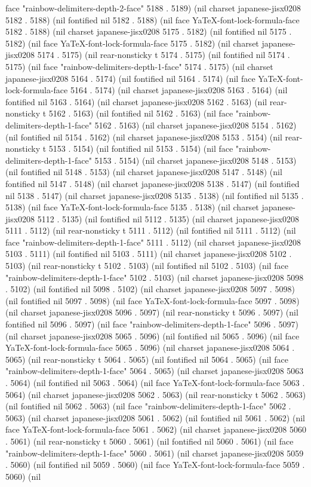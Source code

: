 face "rainbow-delimiters-depth-2-face" 5188 . 5189) (nil charset japanese-jisx0208 5182 . 5188) (nil fontified nil 5182 . 5188) (nil face YaTeX-font-lock-formula-face 5182 . 5188) (nil charset japanese-jisx0208 5175 . 5182) (nil fontified nil 5175 . 5182) (nil face YaTeX-font-lock-formula-face 5175 . 5182) (nil charset japanese-jisx0208 5174 . 5175) (nil rear-nonsticky t 5174 . 5175) (nil fontified nil 5174 . 5175) (nil face "rainbow-delimiters-depth-1-face" 5174 . 5175) (nil charset japanese-jisx0208 5164 . 5174) (nil fontified nil 5164 . 5174) (nil face YaTeX-font-lock-formula-face 5164 . 5174) (nil charset japanese-jisx0208 5163 . 5164) (nil fontified nil 5163 . 5164) (nil charset japanese-jisx0208 5162 . 5163) (nil rear-nonsticky t 5162 . 5163) (nil fontified nil 5162 . 5163) (nil face "rainbow-delimiters-depth-1-face" 5162 . 5163) (nil charset japanese-jisx0208 5154 . 5162) (nil fontified nil 5154 . 5162) (nil charset japanese-jisx0208 5153 . 5154) (nil rear-nonsticky t 5153 . 5154) (nil fontified nil 5153 . 5154) (nil face "rainbow-delimiters-depth-1-face" 5153 . 5154) (nil charset japanese-jisx0208 5148 . 5153) (nil fontified nil 5148 . 5153) (nil charset japanese-jisx0208 5147 . 5148) (nil fontified nil 5147 . 5148) (nil charset japanese-jisx0208 5138 . 5147) (nil fontified nil 5138 . 5147) (nil charset japanese-jisx0208 5135 . 5138) (nil fontified nil 5135 . 5138) (nil face YaTeX-font-lock-formula-face 5135 . 5138) (nil charset japanese-jisx0208 5112 . 5135) (nil fontified nil 5112 . 5135) (nil charset japanese-jisx0208 5111 . 5112) (nil rear-nonsticky t 5111 . 5112) (nil fontified nil 5111 . 5112) (nil face "rainbow-delimiters-depth-1-face" 5111 . 5112) (nil charset japanese-jisx0208 5103 . 5111) (nil fontified nil 5103 . 5111) (nil charset japanese-jisx0208 5102 . 5103) (nil rear-nonsticky t 5102 . 5103) (nil fontified nil 5102 . 5103) (nil face "rainbow-delimiters-depth-1-face" 5102 . 5103) (nil charset japanese-jisx0208 5098 . 5102) (nil fontified nil 5098 . 5102) (nil charset japanese-jisx0208 5097 . 5098) (nil fontified nil 5097 . 5098) (nil face YaTeX-font-lock-formula-face 5097 . 5098) (nil charset japanese-jisx0208 5096 . 5097) (nil rear-nonsticky t 5096 . 5097) (nil fontified nil 5096 . 5097) (nil face "rainbow-delimiters-depth-1-face" 5096 . 5097) (nil charset japanese-jisx0208 5065 . 5096) (nil fontified nil 5065 . 5096) (nil face YaTeX-font-lock-formula-face 5065 . 5096) (nil charset japanese-jisx0208 5064 . 5065) (nil rear-nonsticky t 5064 . 5065) (nil fontified nil 5064 . 5065) (nil face "rainbow-delimiters-depth-1-face" 5064 . 5065) (nil charset japanese-jisx0208 5063 . 5064) (nil fontified nil 5063 . 5064) (nil face YaTeX-font-lock-formula-face 5063 . 5064) (nil charset japanese-jisx0208 5062 . 5063) (nil rear-nonsticky t 5062 . 5063) (nil fontified nil 5062 . 5063) (nil face "rainbow-delimiters-depth-1-face" 5062 . 5063) (nil charset japanese-jisx0208 5061 . 5062) (nil fontified nil 5061 . 5062) (nil face YaTeX-font-lock-formula-face 5061 . 5062) (nil charset japanese-jisx0208 5060 . 5061) (nil rear-nonsticky t 5060 . 5061) (nil fontified nil 5060 . 5061) (nil face "rainbow-delimiters-depth-1-face" 5060 . 5061) (nil charset japanese-jisx0208 5059 . 5060) (nil fontified nil 5059 . 5060) (nil face YaTeX-font-lock-formula-face 5059 . 5060) (nil 